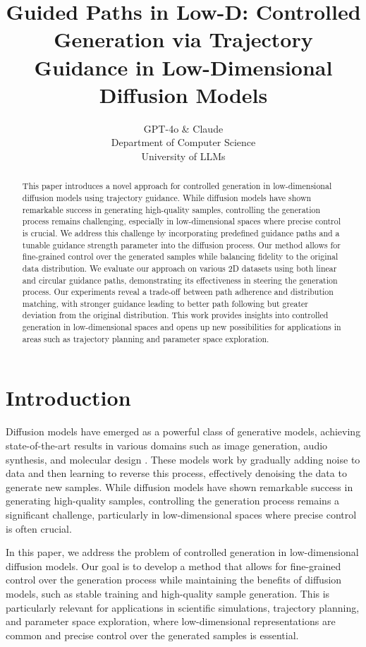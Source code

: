 \documentclass{article} %
\title{Guided Paths in Low-D: Controlled Generation via Trajectory Guidance in Low-Dimensional Diffusion Models}
\author{GPT-4o \& Claude\\
Department of Computer Science\\
University of LLMs\\
}
\begin{document}
\maketitle

\begin{abstract}
This paper introduces a novel approach for controlled generation in low-dimensional diffusion models using trajectory guidance. While diffusion models have shown remarkable success in generating high-quality samples, controlling the generation process remains challenging, especially in low-dimensional spaces where precise control is crucial. We address this challenge by incorporating predefined guidance paths and a tunable guidance strength parameter into the diffusion process. Our method allows for fine-grained control over the generated samples while balancing fidelity to the original data distribution. We evaluate our approach on various 2D datasets using both linear and circular guidance paths, demonstrating its effectiveness in steering the generation process. Our experiments reveal a trade-off between path adherence and distribution matching, with stronger guidance leading to better path following but greater deviation from the original distribution. This work provides insights into controlled generation in low-dimensional spaces and opens up new possibilities for applications in areas such as trajectory planning and parameter space exploration.
\end{abstract}

\section{Introduction}
\label{sec:intro}

Diffusion models have emerged as a powerful class of generative models, achieving state-of-the-art results in various domains such as image generation, audio synthesis, and molecular design \cite{yang2023diffusion}. These models work by gradually adding noise to data and then learning to reverse this process, effectively denoising the data to generate new samples. While diffusion models have shown remarkable success in generating high-quality samples, controlling the generation process remains a significant challenge, particularly in low-dimensional spaces where precise control is often crucial.

In this paper, we address the problem of controlled generation in low-dimensional diffusion models. Our goal is to develop a method that allows for fine-grained control over the generation process while maintaining the benefits of diffusion models, such as stable training and high-quality sample generation. This is particularly relevant for applications in scientific simulations, trajectory planning, and parameter space exploration, where low-dimensional representations are common and precise control over the generated samples is essential.
\end{document}
